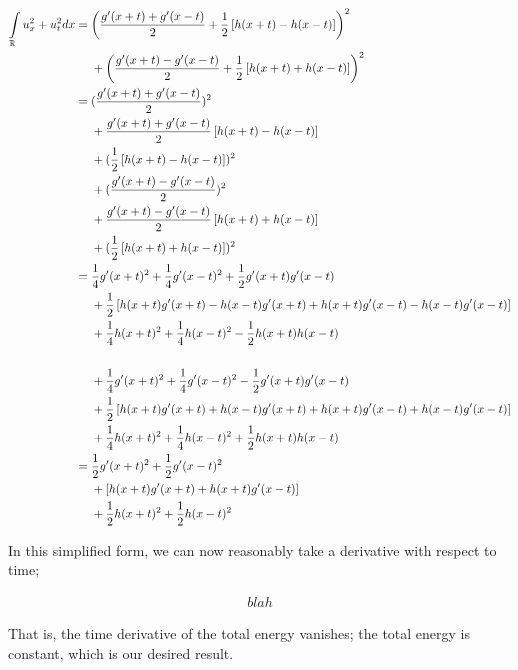 \documentclass[a4paper,12pt]{article}
\begin{document}
\begin{align*}
\int\limits_\R u_x^2 + u_t^2 dx &= \left(\frac{g'(x+t)+g'(x-t)}{2} + \frac{1}{2}\left[h(x+t) - h(x-t)\right]\right)^2 \\
&\phantom{{}={}}+ \left(\frac{g'(x+t)-g'(x-t)}{2} + \frac{1}{2}\left[h(x+t) + h(x-t)\right]\right)^2\\
&= (\frac{g'(x+t)+g'(x-t)}{2})^2\\ &\phantom{{}={}}+ \frac{g'(x+t)+g'(x-t)}{2}\left[h(x+t) - h(x-t)\right]\\ &\phantom{{}={}}+ (\frac{1}{2}\left[h(x+t) - h(x-t)\right])^2 \\
&\phantom{{}={}}+ (\frac{g'(x+t)-g'(x-t)}{2})^2\\ &\phantom{{}={}}+\frac{g'(x+t)-g'(x-t)}{2}\left[h(x+t) + h(x-t)\right] \\&\phantom{{}={}}+ (\frac{1}{2}\left[h(x+t) + h(x-t)\right])^2\\
&= \frac{1}{4}g'(x+t)^2  + \frac{1}{4} g'(x-t)^2 + \frac{1}{2} g'(x+t)g'(x-t)\\ &\phantom{{}={}}+ \frac{1}{2}\left[h(x+t)g'(x+t) - h(x-t)g'(x+t) +h(x+t)g'(x-t) - h(x-t)g'(x-t) \right]\\ &\phantom{{}={}}+ \frac{1}{4}h(x+t)^2  + \frac{1}{4} h(x-t)^2 - \frac{1}{2} h(x+t)h(x-t)\\ \\
&\phantom{{}={}}+ \frac{1}{4}g'(x+t)^2  + \frac{1}{4} g'(x-t)^2 - \frac{1}{2} g'(x+t)g'(x-t)\\ &\phantom{{}={}}+\frac{1}{2}\left[h(x+t)g'(x+t) + h(x-t)g'(x+t) +h(x+t)g'(x-t) + h(x-t)g'(x-t) \right] \\&\phantom{{}={}}+ \frac{1}{4}h(x+t)^2  + \frac{1}{4} h(x-t)^2 + \frac{1}{2} h(x+t)h(x-t)\\
&= \frac{1}{2}g'(x+t)^2  + \frac{1}{2} g'(x-t)^2 \\ &\phantom{{}={}}+ \left[h(x+t)g'(x+t) +h(x+t)g'(x-t)\right]\\ &\phantom{{}={}}+ \frac{1}{2}h(x+t)^2  + \frac{1}{2} h(x-t)^2\\
\end{align*}

In this simplified form, we can now reasonably take a derivative with respect to time;

\begin{align*}
blah
\end{align*}

That is, the time derivative of the total energy vanishes; the total energy is constant, which is our desired result.
\end{document}
